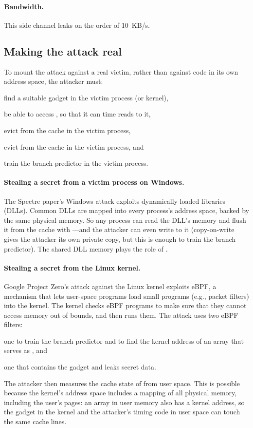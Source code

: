 \paragraph{Bandwidth.}
This side channel leaks on the order of 10~KB/s.

\subsection{Making the attack real}

To mount the attack against a real victim, rather than against code in
its own address space, the attacker must:
\begin{compactitem}
  \item find a suitable gadget in the victim process (or kernel),
  \item be able to access , so that it can time reads to it,
  \item evict  from the cache in the victim process,
  \item evict  from the cache in the victim process, and
  \item train the branch predictor in the victim process.
\end{compactitem}

\paragraph{Stealing a secret from a victim process on Windows.}
The Spectre paper's Windows attack exploits dynamically loaded libraries
(DLLs).
Common DLLs are mapped into every process's address space, backed by the
same physical memory.
So any process can read the DLL's memory and flush it from the cache with
---and the attacker can even write to it (copy-on-write
gives the attacker its own private copy, but this is enough to train the
branch predictor).
The shared DLL memory plays the role of .

\paragraph{Stealing a secret from the Linux kernel.}
Google Project Zero's attack against the Linux kernel\autocite{horn:projectzero}
exploits eBPF, a mechanism that lets user-space programs load small
programs (e.g., packet filters) into the kernel.
The kernel checks eBPF programs to make sure that they cannot access
memory out of bounds, and then runs them.
The attack uses two eBPF filters:
\begin{compactenum}
  \item one to train the branch predictor and to find the kernel address of
        an array that serves as , and
  \item one that contains the gadget and leaks secret data.
\end{compactenum}
The attacker then measures the cache state of  from user
space.
This is possible because the kernel's address space includes a mapping
of all physical memory, including the user's pages: an array in user
memory also has a kernel address, so the gadget in the kernel and the
attacker's timing code in user space can touch the same cache lines.

